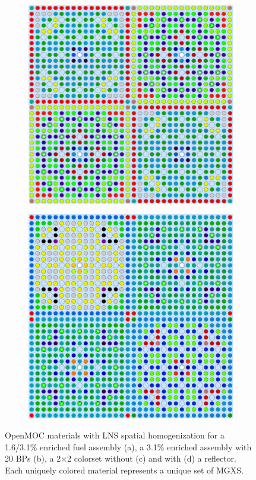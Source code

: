 \begin{figure}[h!]
\begin{subfigure}{.47\textwidth}
  \caption{}
  \label{fig:chap9-31-20BPs-lns-materials}
\end{subfigure}
\begin{subfigure}{.47\textwidth}
  \centering
  \includegraphics[width=0.9\linewidth]{figures/patterns/lns/2x2/materials}
  \caption{}
  \label{fig:chap9-2x2-lns-materials}
\end{subfigure}%
\begin{subfigure}{.47\textwidth}
  \centering
  \includegraphics[width=0.9\linewidth]{figures/patterns/lns/reflector/materials}
  \caption{}
  \label{fig:chap9-reflector-lns-materials}
\end{subfigure}
\caption[Depiction of LNS spatially homogenized materials]{OpenMOC materials with \ac{LNS} spatial homogenization for a 1.6/3.1\% enriched fuel assembly (a), a 3.1\% enriched assembly with 20 \acp{BP} (b), a 2$\times$2 colorset without (c) and with (d) a reflector. Each uniquely colored material represents a unique set of \ac{MGXS}.}
\label{fig:chap9-lns-materials}
\end{figure}

